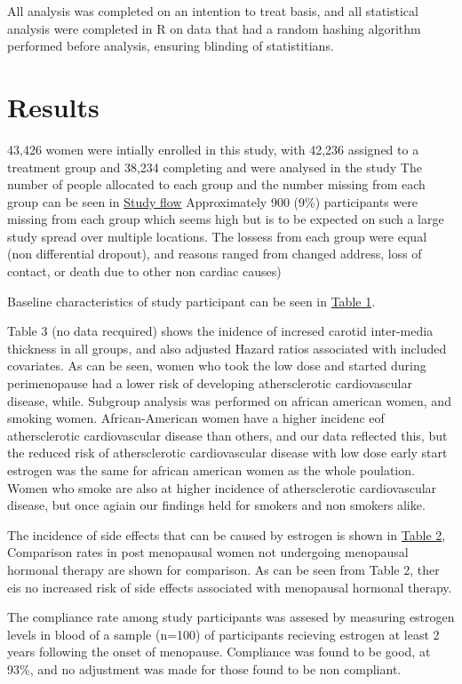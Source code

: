 \documentclass[11pt]{article}
\begin{document}
		All analysis was completed on an intention to treat basis, and all statistical analysis were completed in R \cite{RCoreTeam2012} on data that had a random hashing algorithm performed before analysis, ensuring blinding of statistitians.



	\section{Results}
		43,426 women were intially enrolled in this study, with 42,236 assigned to a treatment group and 38,234 completing and were analysed in the study
		The number of people allocated to each group and the number missing from each group can be seen in  \hyperref[flow]{Study flow}
		Approximately 900 (9\%)  participants were missing from each group which seems high but is to be expected on such a large study spread over multiple locations. 
		The lossess from each group were equal (non differential dropout), and reasons ranged from changed address, loss of contact, or death due to other non cardiac causes)


		Baseline characteristics of study participant can be seen in \hyperref[table1]{Table 1}.


		Table 3 (no data recquired) shows the inidence of incresed carotid inter-media thickness in all groups, and also adjusted Hazard ratios associated with included covariates.
		As can be seen, women who took the low dose and started during perimenopause had a lower risk of developing athersclerotic cardiovascular disease, while.
		Subgroup analysis was performed on african american women, and smoking women.
		African-American women have a higher incidenc eof athersclerotic cardiovascular disease than others, and our data reflected this, but the reduced risk of athersclerotic cardiovascular disease with low dose early start estrogen was the same for african american women as the whole poulation.
		Women who smoke are also at higher incidence of athersclerotic cardiovascular disease, but once agiain our findings held for smokers and non smokers alike.


		The incidence of side effects that can be caused by estrogen is shown in \hyperref[table2]{Table 2}, Comparison rates in post menopausal women not undergoing menopausal hormonal therapy are shown for comparison.
		As can be seen from Table 2, ther eis no increased risk of side effects associated with menopausal hormonal therapy.


		The compliance rate among study participants was assesed by measuring estrogen levels in blood of a sample (n=100) of participants recieving estrogen at least 2 years following the onset of menopause. Compliance was found to be good, at 93\%, and no adjustment was made for those found to be non compliant.
\end{document}
